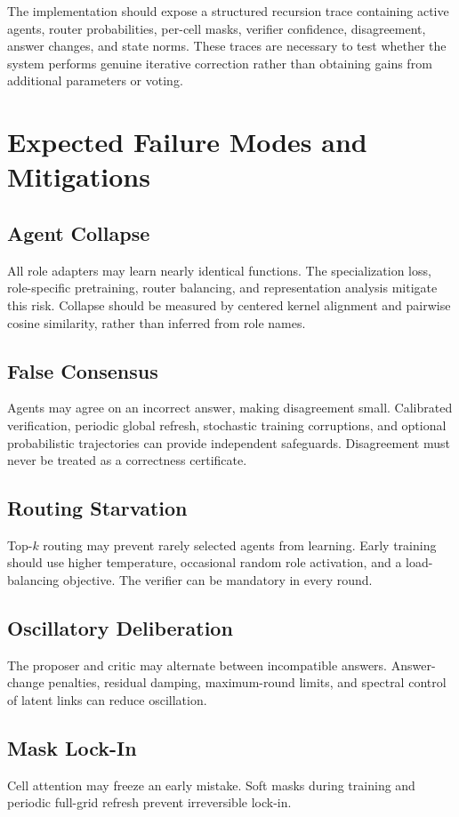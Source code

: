 \documentclass[10pt,a4paper,twocolumn]{article}
\begin{document}
The implementation should expose a structured recursion trace containing active agents, router probabilities, per-cell masks, verifier confidence, disagreement, answer changes, and state norms. These traces are necessary to test whether the system performs genuine iterative correction rather than obtaining gains from additional parameters or voting.

\section{Expected Failure Modes and Mitigations}
\subsection{Agent Collapse}
All role adapters may learn nearly identical functions. The specialization loss, role-specific pretraining, router balancing, and representation analysis mitigate this risk. Collapse should be measured by centered kernel alignment and pairwise cosine similarity, rather than inferred from role names.

\subsection{False Consensus}
Agents may agree on an incorrect answer, making disagreement small. Calibrated verification, periodic global refresh, stochastic training corruptions, and optional probabilistic trajectories can provide independent safeguards. Disagreement must never be treated as a correctness certificate.

\subsection{Routing Starvation}
Top-$k$ routing may prevent rarely selected agents from learning. Early training should use higher temperature, occasional random role activation, and a load-balancing objective. The verifier can be mandatory in every round.

\subsection{Oscillatory Deliberation}
The proposer and critic may alternate between incompatible answers. Answer-change penalties, residual damping, maximum-round limits, and spectral control of latent links can reduce oscillation.

\subsection{Mask Lock-In}
Cell attention may freeze an early mistake. Soft masks during training and periodic full-grid refresh prevent irreversible lock-in.
\end{document}
